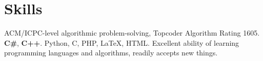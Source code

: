 \documentclass[10pt,a4paper,roman]{moderncv} %
\begin{document}
\section{Skills}
       {ACM/ICPC-level algorithmic problem-solving, Topcoder Algorithm Rating 1605\footnotemark[6]{}.}
       {\textbf{C\#}, \textbf{C++}.\newline{}%
        Python, C, PHP, \LaTeX, HTML.}
       {Excellent ability of learning programming languages and algorithms, readily accepts new things.}
\end{document}
